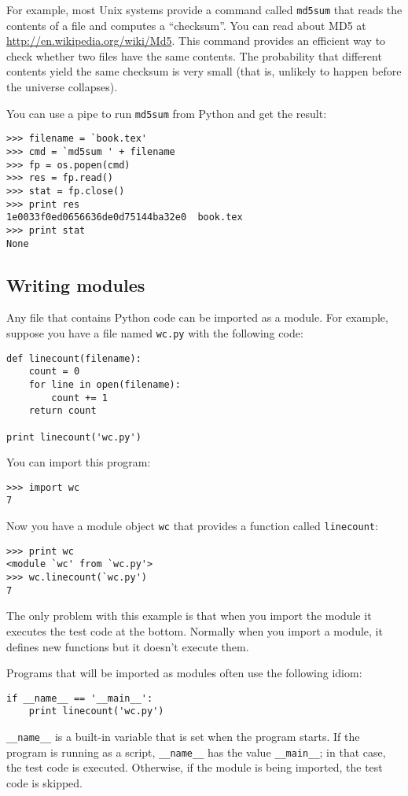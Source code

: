 \documentclass{article}
\begin{document}
For example, most Unix systems provide a command called \verb|md5sum| that
reads the contents of a file and computes a ``checksum''. You
can read about MD5 at \url{http://en.wikipedia.org/wiki/Md5}. This command
provides an efficient way to check whether two files have the same
contents. The probability that different contents yield the same
checksum is very small (that is, unlikely to happen before the
universe collapses).

You can use a pipe to run \verb|md5sum| from Python and get the result:
\begin{verbatim}
>>> filename = `book.tex'
>>> cmd = `md5sum ' + filename
>>> fp = os.popen(cmd)
>>> res = fp.read()
>>> stat = fp.close()
>>> print res
1e0033f0ed0656636de0d75144ba32e0  book.tex
>>> print stat
None
\end{verbatim}

\subsection{Writing modules} %
Any file that contains Python code can be imported as a module. For
example, suppose you have a file named \verb|wc.py| with the following
code:
\begin{verbatim}
def linecount(filename):
    count = 0
    for line in open(filename):
        count += 1
    return count

print linecount('wc.py')
\end{verbatim}
You can import this program:
\begin{verbatim}
>>> import wc
7
\end{verbatim}
Now you have a module object \verb|wc| that provides a function called
\verb|linecount|:
\begin{verbatim}
>>> print wc
<module `wc' from `wc.py'>
>>> wc.linecount(`wc.py')
7
\end{verbatim}
The only problem with this example is that when you import the module
it executes the test code at the bottom. Normally when you import a
module, it defines new functions but it doesn't execute them.

Programs that will be imported as modules often use the following
idiom:
\begin{verbatim}
if __name__ == '__main__':
    print linecount('wc.py')
\end{verbatim}
\verb|__name__| is a built-in variable that is set when the program
starts. If the program is running as a script, \verb|__name__| has the
value \verb|__main__|; in that case, the test code is executed.
Otherwise, if the module is being imported, the test code is skipped.
\end{document}
